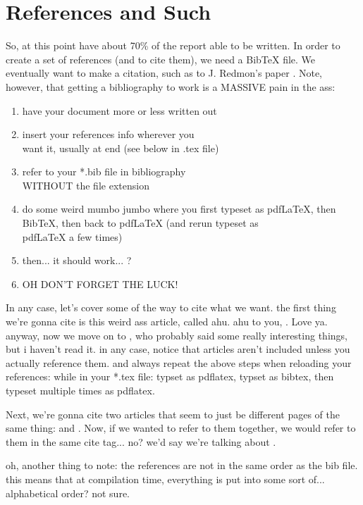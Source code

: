 \documentclass[a4paper,12pt]{article} %
\begin{document}
\section{References and Such} \label {sect_references}
So, at this point have about 70\% of the report able to be written. In order to create a set of references (and to cite them), we need a BibTeX file. We eventually want to make a citation, such as to J. Redmon's paper \cite{red16}. Note, however, that getting a bibliography to work is a MASSIVE pain in the ass:
\begin{enumerate}
\itemsep=-0.5em %
\item have your document more or less written out
\item insert your references info wherever you \\want it, usually at end (see below in .tex file)
\item refer to your *.bib file in bibliography \\WITHOUT the file extension
\item do some weird mumbo jumbo where you first typeset as  pdfLaTeX, then BibTeX, then back to pdfLaTeX (and rerun typeset as\\  pdfLaTeX a few times)
\item then... it should work... ?
\item OH DON'T FORGET THE LUCK!
\end{enumerate}


In any case, let's cover some of the way to cite what we want. the first thing we're gonna cite is this weird ass article, called ahu. ahu to you, \cite{ahu61}. Love ya. anyway, now we move on  to \cite{ab94}, who probably said some really interesting things, but i haven't read it. in any case, notice that articles aren't included unless you actually reference them. and always repeat the above steps when reloading your references: while in your *.tex file: typset as pdflatex, typset as bibtex, then typeset multiple times as pdflatex. 

Next, we're gonna cite two articles that seem to just be different pages of the same thing: \cite{m85} and \cite{m99}. Now, if we wanted to refer to them together, we would refer to them in the same cite tag... no? we'd say we're talking about \cite{m85,m99}.

oh, another thing to note: the references are not in the same order as the bib file. this means that at compilation time, everything is put into some sort of... alphabetical order? not sure.
\end{document}
